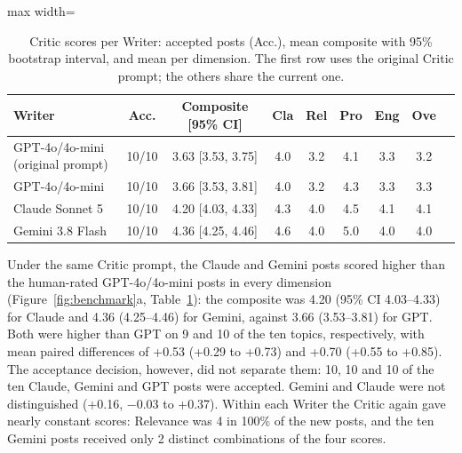 \documentclass[a4paper,twoside]{article}
\newcommand{\BmGptAccept}{10}
\newcommand{\BmGptComp}{3.66}
\newcommand{\BmGptCompLo}{3.53}
\newcommand{\BmGptCompHi}{3.81}
\newcommand{\BmClaAccept}{10}
\newcommand{\BmClaComp}{4.20}
\newcommand{\BmClaCompLo}{4.03}
\newcommand{\BmClaCompHi}{4.33}
\newcommand{\BmGemAccept}{10}
\newcommand{\BmGemVectors}{2}
\newcommand{\BmGemComp}{4.36}
\newcommand{\BmGemCompLo}{4.25}
\newcommand{\BmGemCompHi}{4.46}
\newcommand{\BmDiffClaGpt}{+0.53}
\newcommand{\BmDiffClaGptLo}{+0.29}
\newcommand{\BmDiffClaGptHi}{+0.73}
\newcommand{\BmWinsClaGpt}{9}
\newcommand{\BmDiffGemGpt}{+0.70}
\newcommand{\BmDiffGemGptLo}{+0.55}
\newcommand{\BmDiffGemGptHi}{+0.85}
\newcommand{\BmWinsGemGpt}{10}
\newcommand{\BmDiffGemCla}{+0.16}
\newcommand{\BmDiffGemClaLo}{$-$0.03}
\newcommand{\BmDiffGemClaHi}{+0.37}
\newcommand{\BmRelModeShare}{100\%}
\begin{document}
\begin{table}[t]
\centering
\caption{Critic scores per Writer: accepted posts (Acc.), mean composite with 95\% bootstrap interval, and mean per dimension. The first row uses the original Critic prompt; the others share the current one.}
\label{tab:benchmark}
\begin{adjustbox}{max width=\columnwidth}
\begin{tabular}{lcccccccc}
\toprule
Writer & Acc. & Composite [95\% CI] & Cla & Rel & Pro & Eng & Ove \\
\midrule
GPT-4o/4o-mini (original prompt) & 10/10 & 3.63 [3.53, 3.75] & 4.0 & 3.2 & 4.1 & 3.3 & 3.2 \\
\midrule
GPT-4o/4o-mini & 10/10 & 3.66 [3.53, 3.81] & 4.0 & 3.2 & 4.3 & 3.3 & 3.3 \\
Claude Sonnet 5 & 10/10 & 4.20 [4.03, 4.33] & 4.3 & 4.0 & 4.5 & 4.1 & 4.1 \\
Gemini 3.8 Flash & 10/10 & 4.36 [4.25, 4.46] & 4.6 & 4.0 & 5.0 & 4.0 & 4.0 \\
\bottomrule
\end{tabular}
\end{adjustbox}
\end{table}

Under the same Critic prompt, the Claude and Gemini posts scored higher than the human-rated GPT-4o/4o-mini posts in every dimension (Figure~\ref{fig:benchmark}a, Table~\ref{tab:benchmark}): the composite was \BmClaComp{} (95\% CI \BmClaCompLo{}--\BmClaCompHi{}) for Claude and \BmGemComp{} (\BmGemCompLo{}--\BmGemCompHi{}) for Gemini, against \BmGptComp{} (\BmGptCompLo{}--\BmGptCompHi{}) for GPT. Both were higher than GPT on \BmWinsClaGpt{} and \BmWinsGemGpt{} of the ten topics, respectively, with mean paired differences of \BmDiffClaGpt{} (\BmDiffClaGptLo{} to \BmDiffClaGptHi{}) and \BmDiffGemGpt{} (\BmDiffGemGptLo{} to \BmDiffGemGptHi{}). The acceptance decision, however, did not separate them: \BmClaAccept{}, \BmGemAccept{} and \BmGptAccept{} of the ten Claude, Gemini and GPT posts were accepted. Gemini and Claude were not distinguished (\BmDiffGemCla{}, \BmDiffGemClaLo{} to \BmDiffGemClaHi{}). Within each Writer the Critic again gave nearly constant scores: Relevance was 4 in \BmRelModeShare{} of the new posts, and the ten Gemini posts received only \BmGemVectors{} distinct combinations of the four scores.
\end{document}
